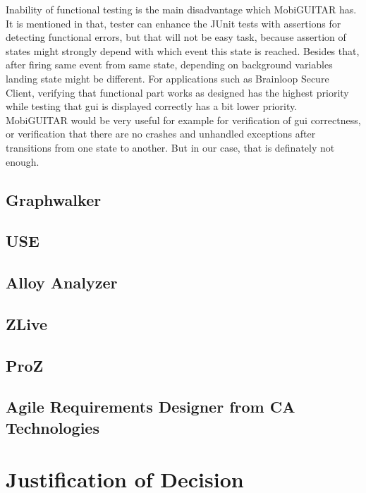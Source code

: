 \par
Inability of functional testing is the main disadvantage which MobiGUITAR has. It is mentioned in \cite{MobiGUITAR} that, tester can enhance the JUnit tests with assertions for detecting functional errors, but that will not be easy task, because assertion of states might strongly depend with which event this state is reached. Besides that, after firing same event from same state, depending on background variables landing state might be different. For applications such as Brainloop Secure Client, verifying that functional part works as designed has the highest priority while testing that \acrshort{gui} is displayed correctly has a bit lower priority. MobiGUITAR would be very useful for example for verification of \acrshort{gui} correctness, or verification that there are no crashes and unhandled exceptions after transitions from one state to another. But in our case, that is definately not enough.

\subsection{Graphwalker}
\subsection{USE}
\subsection{Alloy Analyzer}
\subsection{ZLive}
\subsection{ProZ}
\subsection{Agile Requirements Designer from CA Technologies}

\section{Justification of Decision}